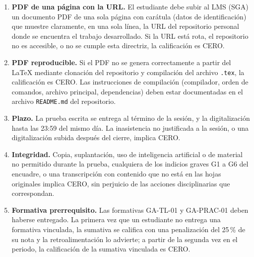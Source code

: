 \documentclass[11pt]{article}
\begin{document}
\begin{cajapiso}[title={Criterios de piso: el incumplimiento de cualquiera implica calificación 0,0/10}]

	\begin{enumerate}[label=\textbf{P\arabic*.},leftmargin=24pt,itemsep=3pt]

		\item \textbf{PDF de una página con la URL.} El estudiante debe subir al LMS (SGA) un documento PDF de una sola página con carátula (datos de identificación) que muestre claramente, en una sola línea, la URL del repositorio personal donde se encuentra el trabajo desarrollado. Si la URL está rota, el repositorio no es accesible, o no se cumple esta directriz, la calificación es CERO.

		\item \textbf{PDF reproducible.} Si el PDF no se genera correctamente a partir del \LaTeX{} mediante clonación del repositorio y compilación del archivo \texttt{.tex}, la calificación es CERO. Las instrucciones de compilación (compilador, orden de comandos, archivo principal, dependencias) deben estar documentadas en el archivo \texttt{README.md} del repositorio.

		\item \textbf{Plazo.} La prueba escrita se entrega al término de la sesión, y la digitalización hasta las 23:59 del mismo día. La inasistencia no justificada a la sesión, o una digitalización subida después del cierre, implica CERO.

		\item \textbf{Integridad.} Copia, suplantación, uso de inteligencia artificial o de material no permitido durante la prueba, cualquiera de los indicios graves G1 a G6 del encuadre, o una transcripción con contenido que no está en las hojas originales implica CERO, sin perjuicio de las acciones disciplinarias que correspondan.

		\item \textbf{Formativa prerrequisito.} Las formativas GA-TL-01 y GA-PRAC-01 deben haberse entregado. La primera vez que un estudiante no entrega una formativa vinculada, la sumativa se califica con una penalización del 25\,\% de su nota y la retroalimentación lo advierte; a partir de la segunda vez en el periodo, la calificación de la sumativa vinculada es CERO.

	\end{enumerate}

\end{cajapiso}
\end{document}
